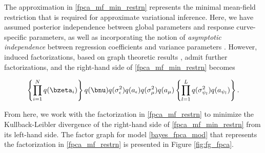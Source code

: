 \documentclass[12pt]{article}
\def\sigsqeps{\sigma^2_{\epsilon}}
\def\aeps{a_{\epsilon}}
\def\sigsqmu{\sigma^2_{\mu}}
\def\amu{a_{\mu}}
\newcommand\sigsqpsi[1]{\sigma^2_{\psi_{#1}}}
\newcommand\apsi[1]{a_{\psi_{#1}}}
\theoremstyle{plain}
\theoremstyle{definition}
\theoremstyle{remark}
\begin{document}
\noindent The approximation in \eqref{fpca_mf_min_restrn} represents the minimal mean-field restriction that is
required for approximate variational inference. Here, we have assumed posterior independence between
global parameters and response curve-specific parameters, as well as incorporating the notion of
\emph{asymptotic independence} between regression coefficients and variance parameters
\cite[Section~3.1]{menictas13}.
However, induced factorizations, based on graph theoretic
results \cite[Section~10.2.5]{bishop06}, admit further factorizations, and the right-hand side of
\eqref{fpca_mf_min_restrn} becomes

\begin{equation}
	\left\{ \prod_{i=1}^N q (\bzeta_i) \right\} q (\bnu) q(\sigsqeps) q(\aeps)
	q(\sigsqmu) q (\amu) \left\{ \prod_{l=1}^L q(\sigsqpsi{l}) q(\apsi{l}) \right\}.
\label{fpca_mf_restrn}
\end{equation}

\noindent From here, we work with the factorization in \eqref{fpca_mf_restrn} to minimize the Kullback-Leibler
divergence  of the right-hand side of \eqref{fpca_mf_min_restrn} from its left-hand side.
The factor graph for model \eqref{bayes_fpca_mod} that represents the factorization in \eqref{fpca_mf_restrn}
is presented in Figure \ref{fig:fg_fpca}.
\end{document}
